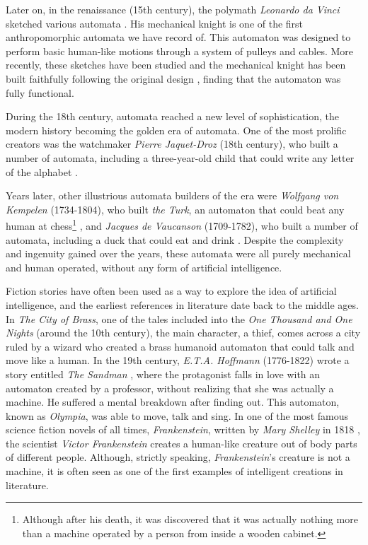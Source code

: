 Later on, in the renaissance (15th century), the polymath \textit{Leonardo da Vinci} sketched various automata \autocite{nils2009}. His mechanical knight is one of the first anthropomorphic automata we have record of. This automaton was designed to perform basic human-like motions through a system of pulleys and cables. More recently, these sketches have been studied and the mechanical knight has been built faithfully following the original design \autocite{elling2006}, finding that the automaton was fully functional. 

During the 18th century, automata reached a new level of sophistication, the modern history becoming the golden era of automata. One of the most prolific creators was the watchmaker \textit{Pierre Jaquet-Droz} (18th century), who built a number of automata, including a three-year-old child that could write any letter of the alphabet \autocite{carrera1979}.

Years later, other illustrious automata builders of the era were \textit{Wolfgang von Kempelen} (1734-1804), who built \textit{the Turk}, an automaton that could beat any human at chess\footnote{Although after his death, it was discovered that it was actually nothing more than a machine operated by a person from inside a wooden cabinet.} \autocite{jay2000}, 
and \textit{Jacques de Vaucanson} (1709-1782), who built a number of automata, including a duck that could eat and drink \autocite{nils2009, trymbaka2022}. Despite the complexity and ingenuity gained over the years, these automata were all purely mechanical and human operated, without any form of artificial intelligence. 

Fiction stories have often been used as a way to explore the idea of artificial intelligence, and the earliest references in literature date back to the middle ages. In \textit{The City of Brass}, one of the tales included into the \textit{One Thousand and One Nights} (around the 10th century), the main character, a thief, comes across a city ruled by a wizard who created a brass humanoid automaton that could talk and move like a human. In the 19th century, \textit{E.T.A. Hoffmann} (1776-1822) wrote a story entitled \textit{The Sandman} \autocite{hoffmann1816}, where the protagonist falls in love with an automaton created by a professor, without realizing that she was actually a machine. He suffered a mental breakdown after finding out. This automaton, known as \textit{Olympia}, was able to move, talk and sing. In one of the most famous science fiction novels of all times, \textit{Frankenstein}, written by \textit{Mary Shelley} in 1818 \autocite{shelley1994}, the scientist \textit{Victor Frankenstein} creates a human-like creature out of body parts of different people. Although, strictly speaking, \textit{Frankenstein}'s creature is not a machine, it is often seen as one of the first examples of intelligent creations in literature.


